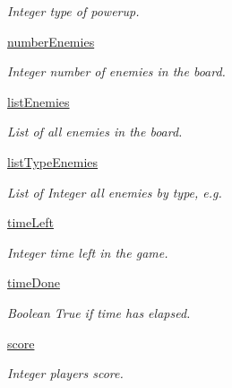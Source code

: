 \begin{DoxyCompactItemize}
\begin{DoxyCompactList}\small\item\em Integer type of powerup. \end{DoxyCompactList}\item 
\hypertarget{classsrc_1_1level_1_1_level_a0a652366b9fe32851d20915af1dbc0f3}{}\hyperlink{classsrc_1_1level_1_1_level_a0a652366b9fe32851d20915af1dbc0f3}{number\+Enemies}\label{classsrc_1_1level_1_1_level_a0a652366b9fe32851d20915af1dbc0f3}

\begin{DoxyCompactList}\small\item\em Integer number of enemies in the board. \end{DoxyCompactList}\item 
\hypertarget{classsrc_1_1level_1_1_level_ad45aaceea3034ea0e83e1627a47ea2d2}{}\hyperlink{classsrc_1_1level_1_1_level_ad45aaceea3034ea0e83e1627a47ea2d2}{list\+Enemies}\label{classsrc_1_1level_1_1_level_ad45aaceea3034ea0e83e1627a47ea2d2}

\begin{DoxyCompactList}\small\item\em List of all enemies in the board. \end{DoxyCompactList}\item 
\hyperlink{classsrc_1_1level_1_1_level_a198d86791a4f4a570909d80490057ae9}{list\+Type\+Enemies}
\begin{DoxyCompactList}\small\item\em List of Integer all enemies by type, e.\+g. \end{DoxyCompactList}\item 
\hypertarget{classsrc_1_1level_1_1_level_a0272ba87f68c6b056d20751096f576d9}{}\hyperlink{classsrc_1_1level_1_1_level_a0272ba87f68c6b056d20751096f576d9}{time\+Left}\label{classsrc_1_1level_1_1_level_a0272ba87f68c6b056d20751096f576d9}

\begin{DoxyCompactList}\small\item\em Integer time left in the game. \end{DoxyCompactList}\item 
\hypertarget{classsrc_1_1level_1_1_level_aec7becdb4db743d76dbb993cb22a22bb}{}\hyperlink{classsrc_1_1level_1_1_level_aec7becdb4db743d76dbb993cb22a22bb}{time\+Done}\label{classsrc_1_1level_1_1_level_aec7becdb4db743d76dbb993cb22a22bb}

\begin{DoxyCompactList}\small\item\em Boolean True if time has elapsed. \end{DoxyCompactList}\item 
\hypertarget{classsrc_1_1level_1_1_level_a91123ee7d794996b5504dcb8550f7684}{}\hyperlink{classsrc_1_1level_1_1_level_a91123ee7d794996b5504dcb8550f7684}{score}\label{classsrc_1_1level_1_1_level_a91123ee7d794996b5504dcb8550f7684}

\begin{DoxyCompactList}\small\item\em Integer player\textquotesingle{}s score. \end{DoxyCompactList}\end{DoxyCompactItemize}


